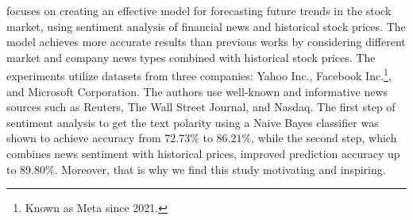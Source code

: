 \textcite{khedr2017predicting} focuses on creating an effective model for forecasting future trends in the stock market, using sentiment analysis of financial news and historical stock prices. The model achieves more accurate results than previous works by considering different market and company news types combined with historical stock prices. The experiments utilize datasets from three companies: Yahoo Inc., Facebook Inc.\footnote{Known as Meta since 2021.}, and Microsoft Corporation. The authors use well-known and informative news sources such as Reuters, The Wall Street Journal, and Nasdaq. The first step of sentiment analysis to get the text polarity using a Naive Bayes classifier was shown to achieve accuracy from $72.73\%$ to $86.21\%$, while the second step, which combines news sentiment with historical prices, improved prediction accuracy up to $89.80\%$. Moreover, that is why we find this study motivating and inspiring.